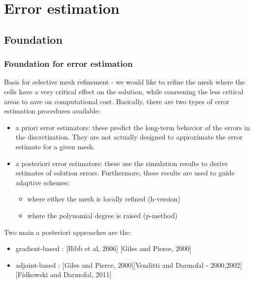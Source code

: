 \documentclass{beamer}
\begin{document}
\section[Error estimates]{Error estimation}

\subsection{Foundation}
\begin{frame}
\frametitle{Foundation for error estimation}
\scriptsize
Basis for selective mesh refinement - we would like to refine the mesh where the cells have a very critical effect on the solution, while coarsening the less critical areas to save on computational cost.\newline 
Basically, there are two types of error estimation procedures available:
\begin{itemize}
\item a priori error estimators:  these predict the long-term behavior of the errors in the discretization. They are not actually designed to approximate the error estimate for a given mesh. 
\item a posteriori error estimators: these use the simulation results to derive estimates of solution errors. Furthermore, these results are used to guide adaptive schemes:
\begin{itemize}
\scriptsize
\item where either the mesh is locally refined (h-version) 
\item where the polynomial degree is raised (p-method)
\end{itemize}
\end{itemize}
Two main a posteriori approaches are the:
\begin{itemize}
\item gradient-based : [Bibb et al, 2006] [Giles and Pierce, 2000]
\item adjoint-based : [Giles and Pierce, 2000][Venditti and Darmofal - 2000,2002][Fidkowski and Darmofal, 2011] 
\end{itemize}
\end{frame}
\end{document}

